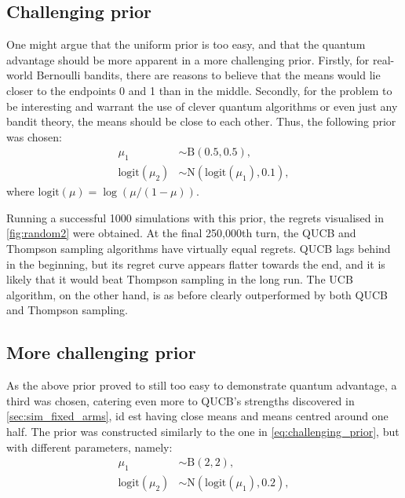 \subsection{Challenging prior}
One might argue that the uniform prior is too easy, and that the quantum advantage should be more apparent in a more challenging prior.
Firstly, for real-world Bernoulli bandits, there are reasons to believe that the means would lie closer to the endpoints 0 and 1 than in the middle.
Secondly, for the problem to be interesting and warrant the use of clever quantum algorithms or even just any bandit theory, the means should be close to each other.
Thus, the following prior was chosen:
\begin{equation}
    \label{eq:challenging_prior}
    \begin{aligned}
        \mu_1               & \sim \text{B}(0.5, 0.5),                 \\
        \text{logit}(\mu_2) & \sim \text{N}(\text{logit}(\mu_1), 0.1),
    \end{aligned}
\end{equation}
where $\text{logit}(\mu) = \log(\mu/(1-\mu))$.

Running a successful 1000 simulations with this prior, the regrets visualised in \cref{fig:random2} were obtained.
At the final 250,000th turn, the QUCB and Thompson sampling algorithms have virtually equal regrets.
QUCB lags behind in the beginning, but its regret curve appears flatter towards the end, and it is likely that it would beat Thompson sampling in the long run.
The UCB algorithm, on the other hand, is as before clearly outperformed by both QUCB and Thompson sampling.

\subsection{More challenging prior}
As the above prior proved to still too easy to demonstrate quantum advantage, a third was chosen, catering even more to QUCB's strengths discovered in \cref{sec:sim_fixed_arms}, id est having close means and means centred around one half.
The prior was constructed similarly to the one in \cref{eq:challenging_prior}, but with different parameters, namely:
\begin{equation}
    \label{eq:more_challenging_prior}
    \begin{aligned}
        \mu_1               & \sim \text{B}(2, 2),                     \\
        \text{logit}(\mu_2) & \sim \text{N}(\text{logit}(\mu_1), 0.2),
    \end{aligned}
\end{equation}

